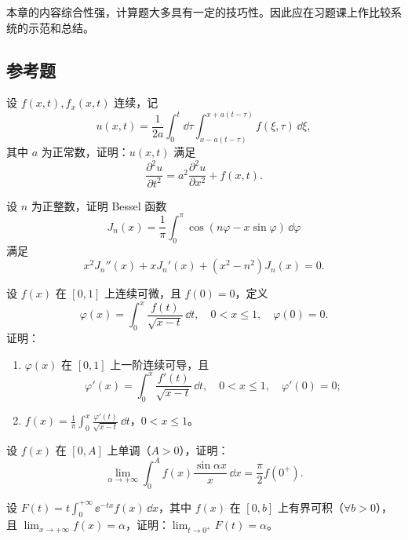 本章的内容综合性强，计算题大多具有一定的技巧性。因此应在习题课上作比较系统的示范和总结。

\subsection{参考题}
\begin{xreferenceproblem}[1]
设 $f(x,t),f_x(x,t)$ 连续，记
  \[
    u(x,t)=\frac1{2a}\int_0^t\dd\tau\int_{x-a(t-\tau)}^{x+a(t-\tau)}f(\xi,\tau)\,\dd\xi,
  \]
  其中 $a$ 为正常数，证明：$u(x,t)$ 满足
  \[
    \frac{\partial^2u}{\partial t^2}=a^2\frac{\partial^2u}{\partial x^2}+f(x,t).
  \]
\end{xreferenceproblem}

\begin{xreferenceproblem}[2]
设 $n$ 为正整数，证明 Bessel 函数
  \[
    J_n(x)=\frac1\pi\int_0^\pi\cos(n\varphi-x\sin\varphi)\,\dd\varphi
  \]
  满足
  \[
    x^2J_n''(x)+xJ_n'(x)+(x^2-n^2)J_n(x)=0.
  \]
\end{xreferenceproblem}

\begin{xreferenceproblem}[3]
设 $f(x)$ 在 $[0,1]$ 上连续可微，且 $f(0)=0$，定义
  \[
    \varphi(x)=\int_0^x\frac{f(t)}{\sqrt{x-t}}\,\dd t,\quad0<x\leqslant1,\quad\varphi(0)=0.
  \]
  证明：
  \begin{enumerate}[label=(\arabic*)]
    \item $\varphi(x)$ 在 $[0,1]$ 上一阶连续可导，且
    \[
      \varphi'(x)=\int_0^x\frac{f'(t)}{\sqrt{x-t}}\,\dd t,\quad0<x\leqslant1,\quad\varphi'(0)=0;
    \]
    \item $\displaystyle f(x)=\frac1\pi\int_0^x\frac{\varphi'(t)}{\sqrt{x-t}}\,\dd t$，$0<x\leqslant1$。
  \end{enumerate}
\end{xreferenceproblem}

\begin{xreferenceproblem}[4]
设 $f(x)$ 在 $[0,A]$ 上单调（$A>0$），证明：
  \[
    \lim_{\alpha\to+\infty}\int_0^A f(x)\frac{\sin\alpha x}{x}\,\dd x=\frac\pi2f(0^+).
  \]
\end{xreferenceproblem}

\begin{xreferenceproblem}[5]
设 $F(t)=t\displaystyle\int_0^{+\infty}\ee^{-tx}f(x)\,\dd x$，其中 $f(x)$ 在 $[0,b]$ 上有界可积（$\forall b>0$），且 $\displaystyle\lim_{x\to+\infty}f(x)=\alpha$，证明：$\displaystyle\lim_{t\to0^+}F(t)=\alpha$。
\end{xreferenceproblem}

